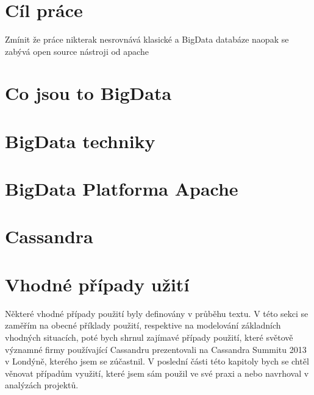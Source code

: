 \documentclass[thesis=M,czech]{FITthesis}[2012/06/26]
\title{
}
\begin{document}
	

\begin{introduction}
\end{introduction}



\chapter{Cíl práce}
Zmínit že práce nikterak nesrovnává klasické a BigData databáze naopak se zabývá open source nástroji od apache



\chapter{Co jsou to BigData}




\chapter{BigData techniky}



\chapter{BigData Platforma Apache}



\chapter{Cassandra}	




\chapter{Vhodné případy užití}
Některé vhodné případy použití byly definovány v průběhu textu. V této sekci se zaměřím na obecné příklady použití, respektive na modelování základních vhodných situacích, poté bych shrnul zajímavé případy použití, které světově významné firmy používající Cassandru prezentovali na Cassandra Summitu 2013 v Londýně, kterého jsem se zúčastnil. V poslední části této kapitoly bych se chtěl věnovat případům využití, které jsem sám použil ve své praxi a nebo navrhoval v analýzách projektů. 
\end{document}

